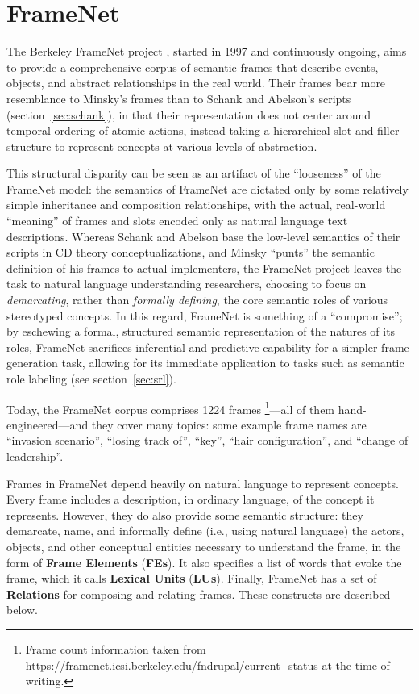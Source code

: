 \section{FrameNet}
\label{sec:framenet}

The Berkeley FrameNet project \citep{framenet}, started in 1997 and continuously ongoing, aims to provide a comprehensive corpus of semantic frames that describe events, objects, and abstract relationships in the real world.
Their frames bear more resemblance to Minsky's frames
than to Schank and Abelson's scripts (section~\ref{sec:schank}), in that their representation does not center around temporal ordering of atomic actions, instead taking a hierarchical slot-and-filler structure to represent concepts at various levels of abstraction.

This structural disparity can be seen as an artifact of the ``looseness'' of the FrameNet model: the semantics of FrameNet are dictated only by some relatively simple inheritance and composition relationships, with the actual, real-world ``meaning'' of frames and slots encoded only as natural language text descriptions. Whereas Schank and Abelson base the low-level semantics of their scripts in CD theory conceptualizations, and Minsky ``punts'' the semantic definition of his frames to actual implementers, the FrameNet project leaves the task to natural language understanding researchers, choosing to focus on \textit{demarcating}, rather than \textit{formally defining}, the core semantic roles of various stereotyped concepts. In this regard, FrameNet is something of a ``compromise''; by eschewing a formal, structured semantic representation of the natures of its roles, FrameNet sacrifices inferential and predictive capability for a simpler frame generation task, allowing for its immediate application to tasks such as semantic role labeling (see section~\ref{sec:srl}).

Today, the FrameNet corpus comprises 1224 frames \footnote{Frame count information taken from \url{https://framenet.icsi.berkeley.edu/fndrupal/current_status} at the time of writing.}---all of them hand-engineered---and they cover many topics: some example frame names are ``invasion scenario'', ``losing track of'', ``key'', ``hair configuration'', and ``change of leadership''.

Frames in FrameNet depend heavily on natural language to represent concepts. Every frame includes a description, in ordinary language, of the concept it represents. However, they do also provide some semantic structure: they demarcate, name, and informally define (i.e., using natural language) the actors, objects, and other conceptual entities necessary to understand the frame, in the form of \textbf{Frame Elements} (\textbf{FEs}). It also specifies a list of words that evoke the frame, which it calls \textbf{Lexical Units} (\textbf{LUs}). Finally, FrameNet has a set of \textbf{Relations} for composing and relating frames. These constructs are described below.

